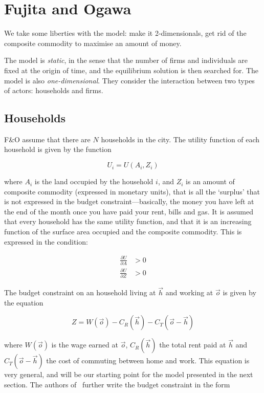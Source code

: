 \section{Fujita and Ogawa}
\label{sec:fujita_and_ogawa}

We take some liberties with the model: make it 2-dimensionals, get rid of the
composite commodity to maximise an amount of money.

The model is \emph{static}, in the sense that the number of firms and
individuals are fixed at the origin of time, and the equilibrium solution is
then searched for. The model is also \emph{one-dimensional}. They consider the
interaction between two types of actors: households and firms.\\

\subsection{Households}
\label{sub:households}

F\&O assume that there are $N$ households in the city. The utility function of each household is given by the function

\begin{equation}
    U_i = U(A_i, Z_i)
\end{equation}

where $A_i$ is the land occupied by the household $i$, and $Z_i$ is an amount of
composite commodity (expressed in monetary units), that is all the `surplus'
that is not expressed in the budget constraint---basically, the money you have
left at the end of the month once you have paid your rent,  bills and gas.
It is assumed that every household has the same utility function, and that it is
an increasing function of the surface area occupied and the composite commodity.
This is expressed in the condition:

\begin{align}
    \frac{\partial U}{\partial A} &> 0\\
    \frac{\partial U}{\partial Z} &> 0
\end{align}

The budget constraint on an household living at $\vec{h}$ and working at
$\vec{o}$ is given by the equation

\begin{equation}
    Z = W\left(\vec{o}\right)-C_R(\vec{h})-C_T(\vec{o}-\vec{h})
\end{equation} 

where $W(\vec{o})$ is the wage earned at $\vec{o}$, $C_R(\vec{h})$ the total rent 
paid at $\vec{h}$ and $C_T(\vec{o}-\vec{h})$ the cost of commuting
between home and work. This equation is very general, and will be our starting
point for the model presented in the next section. The authors
of~\cite{Fujita:1982} further write the budget constraint in the form

